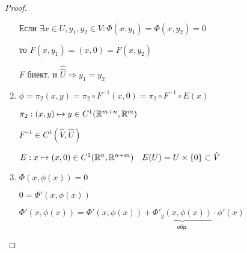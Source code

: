 \begin{proof}
\begin{enumerate}
\[                \]
                Если $\exists x \in U, y_1, y_2 \in V : \Phi(x, y_1) = \Phi(x, y_2) = 0$
                \par \quad то $F(x, y_1) = (x, 0) = F(x, y_2)$
                \par \quad \quad $F$ биект. и $\hat{\hat U} \Rightarrow y_1 = y_2$ %
            \item $\phi = \pi_2(x, y) = \pi_2 \circ F^{-1}(x, 0) = \pi_2 \circ F^{-1} \circ E(x)$
                \par $\pi_2 : (x, y) \mapsto y \in C^1(\mathbb{R}^{m+n}, \mathbb{R}^m)$
                \par $F^{-1} \in C^1(\hat V, \hat U)$
                \par $E  : x \mapsto (x, 0) \in C^1(\mathbb{R}^n, \mathbb{R}^{n+m}) \quad E(U) = U \times \{0\} \subset \hat V$
            \item $\Phi(x, \phi(x)) = 0$
                \par $0 = \Phi'(x, \phi(x))$ %
                \par $\Phi'(x, \phi(x)) = \Phi'(x, \phi(x)) + \underbrace{\Phi'_y(x, \phi(x))}_{\text{обр.}} \cdot \phi'(x)$ 
        \end{enumerate}
    \end{proof}

